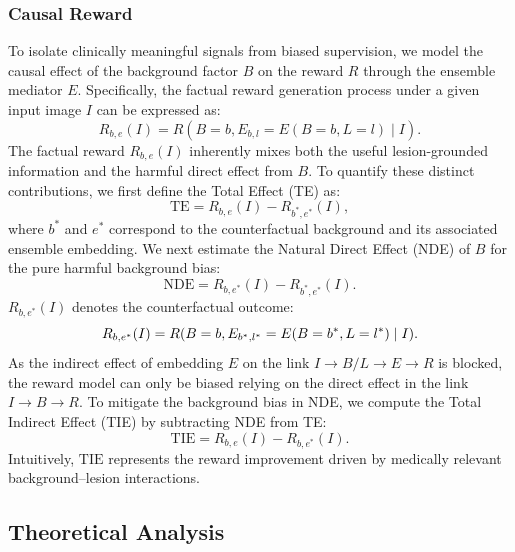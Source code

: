 \subsubsection{Causal Reward}

To isolate clinically meaningful signals from biased supervision, 
we model the causal effect of the background factor $B$ on the reward $R$ through the ensemble mediator $E$. 
Specifically, the factual reward generation process under a given input image $I$ can be expressed as:
\begin{equation}
R_{b,e}(I) = R(B=b, E_{b,l}=E(B=b,L=l) \mid I).
\end{equation}
The factual reward $R_{b,e}(I)$ inherently mixes both the useful lesion-grounded information and the harmful direct effect from $B$. 
To quantify these distinct contributions, we first define the Total Effect (TE) as:
\begin{equation}
\mathrm{TE} = R_{b,e}(I) - R_{b^{*},e^{*}}(I),
\end{equation}
where $b^{*}$ and $e^{*}$ correspond to the counterfactual background and its associated ensemble embedding. We next estimate the Natural Direct Effect (NDE) of $B$ for the pure harmful background bias:
\begin{equation}
\mathrm{NDE} = R_{b,e^{*}}(I) - R_{b^{*},e^{*}}(I).
\end{equation}
$R_{b,e^{*}}(I)$ denotes the counterfactual outcome: 
\begin{equation}
\small
R_{b,e^{*}}(I) = R(B=b, E_{b^{*},l^{*}}=E(B=b^{*},L=l^{*}) \mid I).
\end{equation}
As the indirect effect of embedding $E$ on the link $I \rightarrow B/L \rightarrow E \rightarrow R$ is blocked, the reward model can only be biased relying on the direct effect in the link $I \rightarrow B \rightarrow R$. To mitigate the background bias in NDE, we compute the Total Indirect Effect (TIE) by subtracting NDE from TE:
\begin{equation}
\mathrm{TIE} = R_{b,e}(I) - R_{b,e^{*}}(I).
\label{eq:tie}
\end{equation}
Intuitively, $\mathrm{TIE}$ represents the reward improvement driven by medically relevant background–lesion interactions.

\subsection{Theoretical Analysis}

